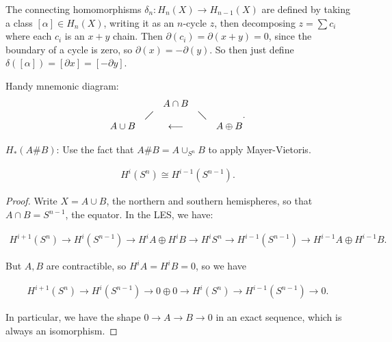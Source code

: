 \begin{theorem}
The connecting homomorphisms \(\delta_{n} :H_{n}(X) \to H_{n-1}(X)\) are
defined by taking a class \([\alpha] \in H_{n}(X)\), writing it as an
\(n\)-cycle \(z\), then decomposing \(z = \sum c_{i}\) where each
\(c_{i}\) is an \(x+y\) chain. Then
\({\partial}(c_{i}) = {\partial}(x+y) = 0\), since the boundary of a
cycle is zero, so \({\partial}(x) = -{\partial}(y)\). So then just
define \(\delta([\alpha]) = [{\partial}x] = [-{\partial}y]\).

Handy mnemonic diagram:
\begin{align*}
\begin{matrix}
 && A\cap B & \\
&\diagup &  & \diagdown \\
A\cup B & & \longleftarrow &  & A \oplus B
\end{matrix}
.\end{align*}

\end{theorem}

\begin{example}

\(H_*(A \# B)\): Use the fact that \(A\# B = A \cup_{S^n} B\) to apply
Mayer-Vietoris.

\end{example}

\begin{proposition}

\begin{align*}H^i(S^n) \cong H^{i-1}(S^{n-1}).\end{align*}

\end{proposition}

\begin{proof}

Write \(X = A \cup B\), the northern and southern hemispheres, so that
\(A \cap B = S^{n-1}\), the equator. In the LES, we have:

\begin{align*}
H^{i+1}(S^n) \xrightarrow{} H^i(S^{n-1}) \xrightarrow{} H^iA \oplus H^i B \xrightarrow{} H^i S^n \xrightarrow{} H^{i-1}(S^{n-1}) \xrightarrow{} H^{i-1}A \oplus H^{i-1}B
.\end{align*}

But \(A, B\) are contractible, so \(H^iA= H^iB = 0\), so we have

\begin{align*}
H^{i+1}(S^n) \xrightarrow{} H^{i}(S^{n-1}) \xrightarrow{} 0 \oplus 0 \xrightarrow{}H^i(S^n) \xrightarrow{} H^{i-1}(S^{n-1}) \xrightarrow{} 0
.\end{align*}

In particular, we have the shape \(0 \to A \to B \to 0\) in an exact
sequence, which is always an isomorphism.

\end{proof}

